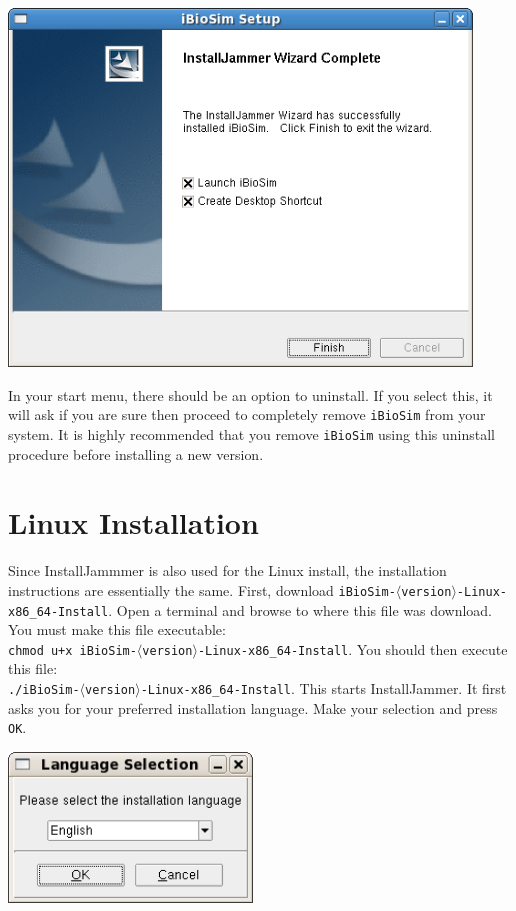\documentclass[titlepage,11pt]{article}
\begin{document}
\includegraphics[height=95mm]{screenshots/finish}

In your start menu, there should be an option to uninstall.  If you
select this, it will ask if you are sure then proceed to completely
remove {\tt iBioSim} from your system.  It is highly recommended that
you remove {\tt iBioSim} using this uninstall procedure before
installing a new version.

\section{Linux Installation}

\noindent
Since InstallJammmer is also used for the Linux install, the
installation instructions are essentially the same.
First, download {\tt iBioSim-$\langle$version$\rangle$-Linux-x86\_64-Install}.
Open a terminal and browse to where this file was download.  You must
make this file executable:\\
{\tt chmod u+x iBioSim-$\langle$version$\rangle$-Linux-x86\_64-Install}.
You should then execute this file:\\
{\tt ./iBioSim-$\langle$version$\rangle$-Linux-x86\_64-Install}. 
This starts InstallJammer.  It first asks you for your
preferred installation language.  Make your selection and press {\tt OK}.

\includegraphics[height=40mm]{screenshots/language}
\end{document}
